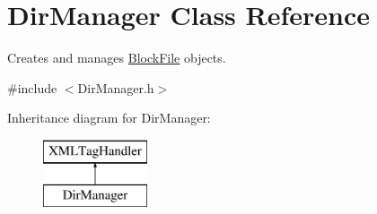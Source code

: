 \hypertarget{class_dir_manager}{}\section{Dir\+Manager Class Reference}
\label{class_dir_manager}


Creates and manages \hyperlink{class_block_file}{Block\+File} objects.  




{\ttfamily \#include $<$Dir\+Manager.\+h$>$}

Inheritance diagram for Dir\+Manager\+:\begin{figure}[H]
\begin{center}
\leavevmode
\includegraphics[height=2.000000cm]{class_dir_manager}
\end{center}
\end{figure}
